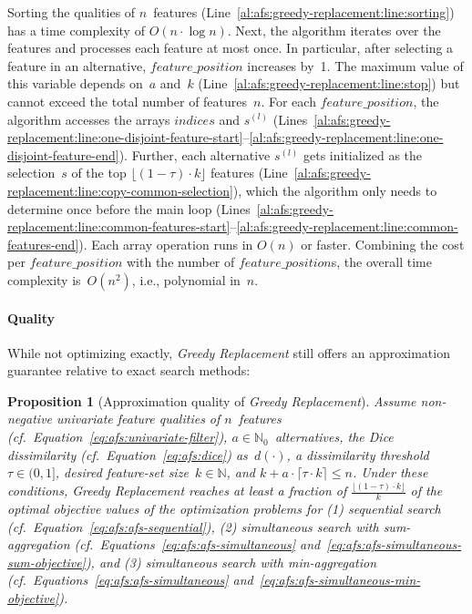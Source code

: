 \documentclass{article}
\newtheorem{proposition}{Proposition}
\theoremstyle{definition}
\begin{document}
Sorting the qualities of $n$~features (Line~\ref{al:afs:greedy-replacement:line:sorting}) has a time complexity of $O(n \cdot \log n)$.
Next, the algorithm iterates over the features and processes each feature at most once.
In particular, after selecting a feature in an alternative, $\mathit{feature\_position}$ increases by~1.
The maximum value of this variable depends on~$a$ and~$k$ (Line~\ref{al:afs:greedy-replacement:line:stop}) but cannot exceed the total number of features~$n$.
For each $\mathit{feature\_position}$, the algorithm accesses the arrays $indices$ and $s^{(l)}$ (Lines~\ref{al:afs:greedy-replacement:line:one-disjoint-feature-start}--\ref{al:afs:greedy-replacement:line:one-disjoint-feature-end}).
Further, each alternative $s^{(l)}$ gets initialized as the selection~$s$ of the top $\lfloor (1 - \tau) \cdot k \rfloor$ features (Line~\ref{al:afs:greedy-replacement:line:copy-common-selection}), which the algorithm only needs to determine once before the main loop (Lines~\ref{al:afs:greedy-replacement:line:common-features-start}--\ref{al:afs:greedy-replacement:line:common-features-end}).
Each array operation runs in $O(n)$ or faster.
Combining the cost per $\mathit{feature\_position}$ with the number of $\mathit{feature\_position}$s, the overall time complexity is~$O(n^2)$, i.e., polynomial in~$n$.

\paragraph{Quality}

While not optimizing exactly, \emph{Greedy Replacement} still offers an approximation guarantee relative to exact search methods:
%
\begin{proposition}[Approximation quality of \emph{Greedy Replacement}]
	Assume non-negative univariate feature qualities of $n$~features (cf.~Equation~\ref{eq:afs:univariate-filter}), $a \in \mathbb{N}_0$~alternatives, the Dice dissimilarity (cf.~Equation~\ref{eq:afs:dice}) as~$d(\cdot)$, a dissimilarity threshold~$\tau \in (0,1]$, desired feature-set size~$k \in \mathbb{N}$, and $k + a \cdot \lceil \tau \cdot k \rceil \leq n$.
	Under these conditions, \emph{Greedy Replacement} reaches at least a fraction of $\frac{\lfloor (1 - \tau) \cdot k \rfloor}{k}$ of the optimal objective values of the optimization problems for (1) sequential search (cf.~Equation~\ref{eq:afs:afs-sequential}), (2) simultaneous search with sum-aggregation (cf.~Equations~\ref{eq:afs:afs-simultaneous} and~\ref{eq:afs:afs-simultaneous-sum-objective}), and (3) simultaneous search with min-aggregation (cf.~Equations~\ref{eq:afs:afs-simultaneous} and~\ref{eq:afs:afs-simultaneous-min-objective}).
	\label{prop:afs:approximation-greedy-replacement}
\end{proposition}
\end{document}
